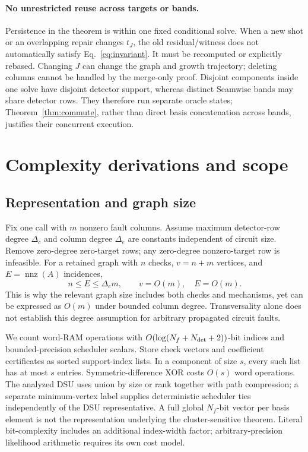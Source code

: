 \paragraph{No unrestricted reuse across targets or bands.}
Persistence in the theorem is within one fixed conditional solve. When a new shot or an overlapping repair changes $t_J$, the old residual/witness does not automatically satisfy Eq.~\eqref{eq:invariant}. It must be recomputed or explicitly rebased. Changing $J$ can change the graph and growth trajectory; deleting columns cannot be handled by the merge-only proof. Disjoint components inside one solve have disjoint detector support, whereas distinct Seamwise bands may share detector rows. They therefore run separate oracle states; Theorem~\ref{thm:commute}, rather than direct basis concatenation across bands, justifies their concurrent execution.

\section{Complexity derivations and scope}\label{app:complexity}
\subsection{Representation and graph size}
Fix one call with $m$ nonzero fault columns. Assume maximum detector-row degree $\Delta_c$ and column degree $\Delta_e$ are constants independent of circuit size. Remove zero-degree zero-target rows; any zero-degree nonzero-target row is infeasible. For a retained graph with $n$ checks, $v=n+m$ vertices, and $E=\operatorname{nnz}(A)$ incidences,
\[n\le E\le\Delta_e m,\qquad v=O(m),\quad E=O(m).\]
This is why the relevant graph size includes both checks and mechanisms, yet can be expressed as $O(m)$ under bounded column degree. Transversality alone does not establish this degree assumption for arbitrary propagated circuit faults.

We count word-RAM operations with $O(\log(N_f+N_{\rm det}+2))$-bit indices and bounded-precision scheduler scalars. Store check vectors and coefficient certificates as sorted support-index lists. In a component of size $s$, every such list has at most $s$ entries. Symmetric-difference XOR costs $O(s)$ word operations. The analyzed DSU uses union by size or rank together with path compression; a separate minimum-vertex label supplies deterministic scheduler ties independently of the DSU representative. A full global $N_f$-bit vector per basis element is not the representation underlying the cluster-sensitive theorem. Literal bit-complexity includes an additional index-width factor; arbitrary-precision likelihood arithmetic requires its own cost model.

